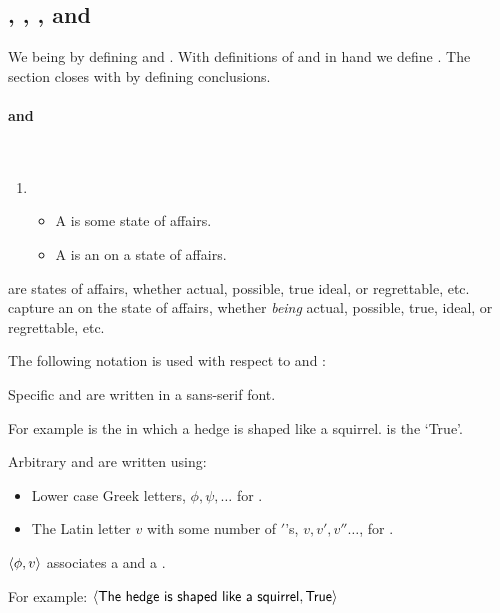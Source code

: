 \subsection{, , , and }
\label{cha:clar:sec:Cons:pvp}

\begin{note}
  We being by defining  and .
  With definitions of  and  in hand we define .
  The section closes with by defining conclusions.
\end{note}

\paragraph*{ and }

\begin{note}
  \begin{definition}
    \label{def:prop-val}
    \mbox{ }%
    \vspace{-\baselineskip}
    \begin{enumerate}[noitemsep, label=]
    \item
      \begin{itemize}
      \item
        A \emph{} is some state of affairs.
      \item
        A \emph{} is an \agpe{} on a state of affairs.
      \end{itemize}
    \end{enumerate}
    \vspace{-\baselineskip}
  \end{definition}

  \noindent%
   are states of affairs, whether actual, possible, true ideal, or regrettable, etc.
   capture an \agpe{} on the state of affairs, whether \emph{being} actual, possible, true, ideal, or regrettable, etc.
  
  The following notation is used with respect to  and :
  \begin{notationList}
  \item
    Specific  and  are written in a \textsf{sans-serif} font.
    
    For example  is the  in which a hedge is shaped like a squirrel.
     is the  `True'.
  \item
    Arbitrary  and  are written using:
    \begin{itemize}[noitemsep]
    \item
      Lower case Greek letters, \(\phi, \psi, \dots\) for .
    \item
      The Latin letter \(v\) with some number of \('\)'s, \(v, v', v'' \dots\), for .
    \end{itemize}
  \item
    \(\langle \phi, v \rangle\) associates a  and a .

    For example:
    \(\pv{\propI{The hedge is shaped like a squirrel}}{\valI{True}}\)
  \end{notationList}
\end{note}

